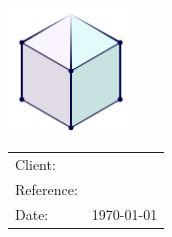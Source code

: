 \begin{titlepage}
	\centering
	{\Large \docname\par}
	\vspace{1.5cm}
	{\huge\bfseries\sffamily \projname \par}
	\vspace{1cm}

\\
\hspace*{\fill}\textcopyright{\imgcopyright}

	\vspace{2cm}
	\includegraphics[width=0.25\textwidth]{figs/logos/block-logo}\par
	\vspace{1cm}

\begin{table}[htb!] \centering
	\begin{tabular}{@{}ll@{}}
	Client: 		& \clientname \\
	Reference: 		& \projnr \\
	Date: 			& \today %
	\end{tabular}
\end{table}


\end{titlepage}